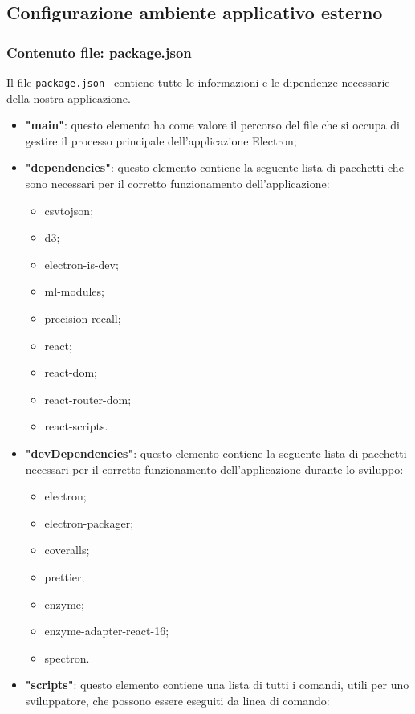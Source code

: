 \subsection{Configurazione ambiente applicativo esterno}
\subsubsection{Contenuto file: package.json}
Il file \verb|package.json | contiene tutte le informazioni e le dipendenze necessarie della nostra applicazione.
\begin{itemize}
    \item \textbf{"main"}: questo elemento ha come valore il percorso del file che si occupa di gestire il processo principale dell'applicazione Electron;
    \item \textbf{"dependencies"}: questo elemento contiene la seguente lista di pacchetti che sono necessari per il corretto funzionamento dell'applicazione:
        \begin{itemize}
            \item csvtojson;
            \item d3;
            \item electron-is-dev;
            \item ml-modules;
            \item precision-recall;
            \item react;
            \item react-dom;
            \item react-router-dom;
            \item react-scripts.
        \end{itemize}
    \item \textbf{"devDependencies"}: questo elemento contiene la seguente lista di pacchetti necessari per il corretto funzionamento dell'applicazione durante lo sviluppo:
        \begin{itemize}
            \item electron;
            \item electron-packager;
            \item coveralls;
            \item prettier;
            \item enzyme;
            \item enzyme-adapter-react-16;
            \item spectron.
        \end{itemize} 
    \item \textbf{"scripts"}: questo elemento contiene una lista di tutti i comandi, utili per uno sviluppatore, che possono essere eseguiti da linea di comando:

\end{itemize}
